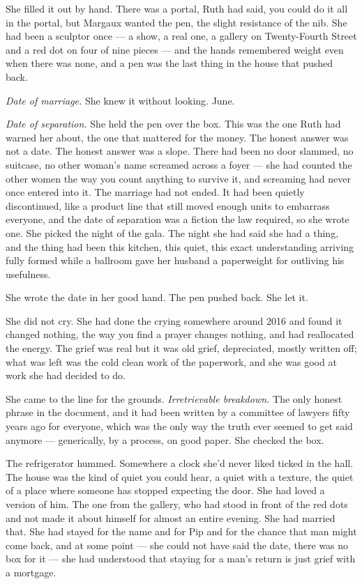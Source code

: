 \documentclass[11pt,openany]{book}
\begin{document}
She filled it out by hand. There was a portal, Ruth had said, you could do it all in the portal, but Margaux wanted the pen, the slight resistance of the nib. She had been a sculptor once --- a show, a real one, a gallery on Twenty-Fourth Street and a red dot on four of nine pieces --- and the hands remembered weight even when there was none, and a pen was the last thing in the house that pushed back.

\textit{Date of marriage.} She knew it without looking. June.

\textit{Date of separation.} She held the pen over the box. This was the one Ruth had warned her about, the one that mattered for the money. The honest answer was not a date. The honest answer was a slope. There had been no door slammed, no suitcase, no other woman's name screamed across a foyer --- she had counted the other women the way you count anything to survive it, and screaming had never once entered into it. The marriage had not ended. It had been quietly discontinued, like a product line that still moved enough units to embarrass everyone, and the date of separation was a fiction the law required, so she wrote one. She picked the night of the gala. The night she had said she had a thing, and the thing had been this kitchen, this quiet, this exact understanding arriving fully formed while a ballroom gave her husband a paperweight for outliving his usefulness.

She wrote the date in her good hand. The pen pushed back. She let it.

She did not cry. She had done the crying somewhere around 2016 and found it changed nothing, the way you find a prayer changes nothing, and had reallocated the energy. The grief was real but it was old grief, depreciated, mostly written off; what was left was the cold clean work of the paperwork, and she was good at work she had decided to do.

She came to the line for the grounds. \textit{Irretrievable breakdown.} The only honest phrase in the document, and it had been written by a committee of lawyers fifty years ago for everyone, which was the only way the truth ever seemed to get said anymore --- generically, by a process, on good paper. She checked the box.

The refrigerator hummed. Somewhere a clock she'd never liked ticked in the hall. The house was the kind of quiet you could hear, a quiet with a texture, the quiet of a place where someone has stopped expecting the door. She had loved a version of him. The one from the gallery, who had stood in front of the red dots and not made it about himself for almost an entire evening. She had married that. She had stayed for the name and for Pip and for the chance that man might come back, and at some point --- she could not have said the date, there was no box for it --- she had understood that staying for a man's return is just grief with a mortgage.
\end{document}
